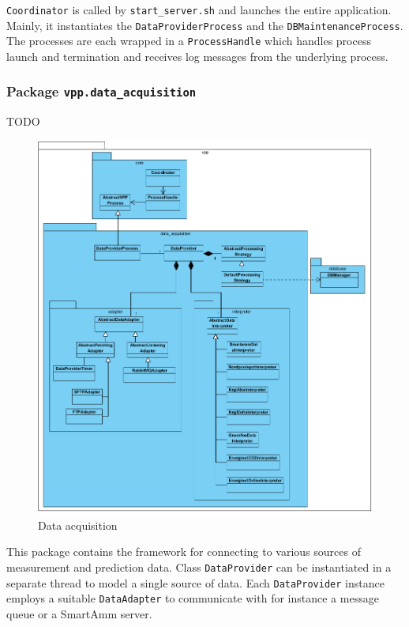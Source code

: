 \texttt{Coordinator} is called by \texttt{start\_server.sh} and launches the entire application. Mainly, it instantiates the \texttt{DataProviderProcess} and the \texttt{DBMaintenanceProcess}. The processes are each wrapped in a \texttt{ProcessHandle} which handles process launch and termination and receives log messages from the underlying process.


\subsubsection{Package \texttt{vpp.data\_acquisition}}
TODO

\begin{figure}[H]
    \centering
    \includegraphics[width=\textwidth]{figures/class_data_acquisition}
    \caption{Data acquisition}
    \label{}
\end{figure}

This package contains the framework for connecting to various sources of measurement and prediction data. Class \texttt{DataProvider} can be instantiated in a separate thread to model a single source of data. Each \texttt{DataProvider} instance employs a suitable \texttt{DataAdapter} to communicate with for instance a message queue or a SmartAmm server.

